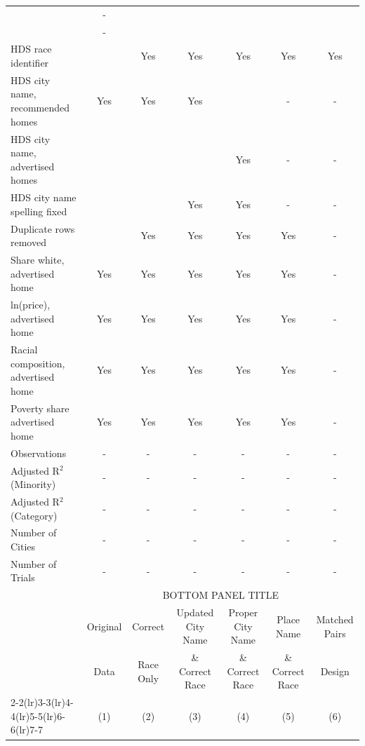 \begin{table}[htbp]
{\begin{tabular}{l*{6}{c}}
                    &   -   &       &     &      &      &  \\
                    & -   &    &    &   &   &  \\
\midrule
HDS race identifier & & Yes & Yes & Yes & Yes & Yes \\
HDS city name, recommended homes & Yes & Yes & Yes & & - & -\\
HDS city name, advertised homes &  &  &  & Yes & - & -\\
HDS city name spelling fixed & & & Yes & Yes & - & -\\
Duplicate rows removed &  & Yes & Yes & Yes & Yes & - \\
\midrule
Share white, advertised home  & Yes & Yes & Yes & Yes & Yes & - \\
ln(price), advertised home  & Yes & Yes & Yes & Yes & Yes & - \\
Racial composition, advertised home & Yes & Yes & Yes & Yes & Yes & - \\
Poverty share advertised home & Yes & Yes & Yes & Yes & Yes & - \\
Observations        &        -   &        -   &        -   &        -   &        -   & - \\
Adjusted R$^2$ (Minority)    &     -   &     -   &     -   &     -   &     -   & - \\
Adjusted R$^2$ (Category)     &     -   &     -   &     -   &     -   &     -   & - \\
Number of Cities    &        -   &        -   &         -   &         -   &         -   & - \\
Number of Trials & - & - & - & - & - & - \\
\bottomrule
\toprule
& \multicolumn{6}{c}{BOTTOM PANEL TITLE}\\
\toprule
                    &\multicolumn{1}{c}{Original}&\multicolumn{1}{c}{Correct}&\multicolumn{1}{c}{Updated City Name}&\multicolumn{1}{c}{Proper City Name}&\multicolumn{1}{c}{Place Name}&\multicolumn{1}{c}{Matched Pairs}\\
                      &\multicolumn{1}{c}{Data}&\multicolumn{1}{c}{Race Only}&\multicolumn{1}{c}{\& Correct Race}&\multicolumn{1}{c}{\& Correct Race}&\multicolumn{1}{c}{\& Correct Race}&\multicolumn{1}{c}{Design}\\                  
                    \cmidrule(lr){2-2}\cmidrule(lr){3-3}\cmidrule(lr){4-4}\cmidrule(lr){5-5}\cmidrule(lr){6-6}\cmidrule(lr){7-7}
                    &\multicolumn{1}{c}{(1)}   &\multicolumn{1}{c}{(2)}   &\multicolumn{1}{c}{(3)}   &\multicolumn{1}{c}{(4)}   &\multicolumn{1}{c}{(5)}   &\multicolumn{1}{c}{(6)}\\

\end{tabular}}
\end{table}
